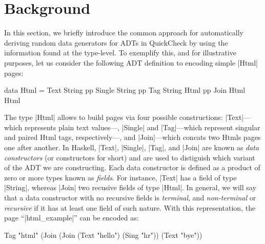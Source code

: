 \section{Background} \label{sec:randomtesting}

In this section, we briefly introduce the common approach for automatically
deriving random data generators for ADTs in QuickCheck by using the information
found at the type-level.
%
To exemplify this, and for illustrative purposes, let us consider the following
ADT definition to encoding simple |Html| pages:
%
\begin{code}
data Html  =   Text    String
           pp  Single  String
           pp  Tag     String  Html
           pp  Join    Html    Html

\end{code}
%
The type |Html| allows to build pages via four possible constructions:
|Text|---which represents plain text values---, |Single| and |Tag|---which
represent singular and paired Html tags, respectively---, and |Join|---which
concats two Htmls pages one after another.
%
In Haskell, |Text|, |Single|, |Tag|, and |Join| are known as \emph{data
  constructors} (or constructors for short) and are used to distiguish which
variant of the ADT we are constructing.
%
Each data constructor is defined as a product of zero or more types known as
\emph{fields}.
%
For instance, |Text| has a field of type |String|, whereas |Join| two recusive
fields of type |Html|.
%
In general, we will say that a data constructor with no recursive fields is
\emph{terminal}, and \emph{non-terminal} or \emph{recursive} if it has at least
one field of such nature.
%
With this representation, the page ``|html_example|'' can be encoded as:
%
\begin{code}
Tag "html" (Join (Join
  (Text "hello") (Sing "hr")) (Text "bye"))
\end{code}
%


